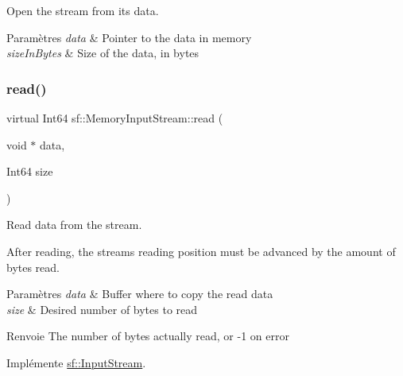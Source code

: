 Open the stream from its data. 


\begin{DoxyParams}{Paramètres}
{\em data} & Pointer to the data in memory \\
\hline
{\em size\+In\+Bytes} & Size of the data, in bytes \\
\hline
\end{DoxyParams}
\mbox{\label{classsf_1_1MemoryInputStream_adff5270c521819639154d42d76fd4c34}} 
\subsubsection{\texorpdfstring{read()}{read()}}
{\footnotesize\ttfamily virtual Int64 sf\+::\+Memory\+Input\+Stream\+::read (\begin{DoxyParamCaption}\item[{void $\ast$}]{data,  }\item[{Int64}]{size }\end{DoxyParamCaption})\hspace{0.3cm}{\ttfamily [virtual]}}



Read data from the stream. 

After reading, the stream\textquotesingle{}s reading position must be advanced by the amount of bytes read.


\begin{DoxyParams}{Paramètres}
{\em data} & Buffer where to copy the read data \\
\hline
{\em size} & Desired number of bytes to read\\
\hline
\end{DoxyParams}
\begin{DoxyReturn}{Renvoie}
The number of bytes actually read, or -\/1 on error 
\end{DoxyReturn}


Implémente \hyperlink{classsf_1_1InputStream_a8dd89c74c1acb693203f50e750c6ae53}{sf\+::\+Input\+Stream}.

\mbox{\label{classsf_1_1MemoryInputStream_aa2ac8fda2bdb4c95248ae90c71633034}} 
